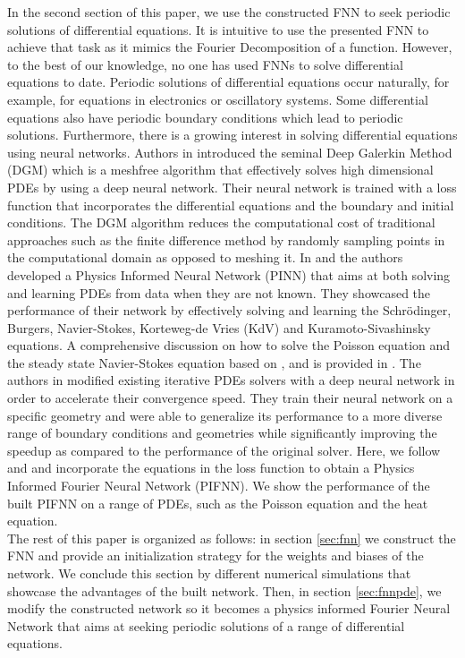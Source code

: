 \documentclass[AMS,STIX1COL]{WileyNJD-v2}
\begin{document}
In the second section of this paper, we use the constructed FNN to seek periodic solutions of differential equations. It is intuitive to use the presented FNN to achieve that task as it mimics the Fourier Decomposition of a function. However, to the best of our knowledge, no one has used FNNs to solve differential equations to date. Periodic solutions of differential equations occur naturally, for example, for equations in electronics or oscillatory systems. Some differential equations also have periodic boundary conditions which lead to periodic solutions. Furthermore, there is a growing interest in solving differential equations using neural networks. Authors in \cite{Sirignano2018} introduced the seminal Deep Galerkin Method (DGM) which is a meshfree algorithm that effectively solves high dimensional PDEs by using a deep neural network. Their neural network is trained with a loss function that incorporates the differential equations and the boundary and initial conditions. The DGM algorithm reduces the computational cost of traditional approaches such as the finite difference method by randomly sampling points in the computational domain as opposed to meshing it. In \cite{Raissi2018} and \cite{raissi2017hidden}  the authors developed a Physics Informed Neural Network (PINN) that aims at both solving and learning PDEs from data when they are not known. They showcased the performance of their network by effectively solving and learning the Schrödinger, Burgers, Navier-Stokes, Korteweg-de Vries (KdV) and Kuramoto-Sivashinsky equations. A comprehensive discussion on how to solve the Poisson equation and the steady state Navier-Stokes equation based on \cite{Raissi2018}, \cite{raissi2017hidden} and \cite{raissi2019Pinn} is provided in \cite{Dockhorn2019}. The authors in \cite{hsieh2019learning} modified existing iterative PDEs solvers with a deep neural network in order to accelerate their convergence speed. They train their neural network on a specific geometry and were able to generalize its performance to a more diverse range of boundary conditions and geometries while significantly improving the speedup as compared to the performance of the original solver. Here, we follow \cite{raissi2019Pinn} and \cite{Sirignano2018} and incorporate the equations in the loss function to obtain a Physics Informed Fourier Neural Network (PIFNN).  We show the performance of the built PIFNN on a range of PDEs, such as the Poisson equation and the heat equation. \\

The rest of this paper is organized as follows: in section \ref{sec:fnn} we construct the FNN and provide an initialization strategy for the weights and biases of the network. We conclude this section by different numerical simulations that showcase the advantages of the built network. Then, in section \ref{sec:fnnpde}, we modify the constructed network so it becomes a physics informed Fourier Neural Network that aims at seeking periodic solutions of a range of differential equations. 
\end{document}
